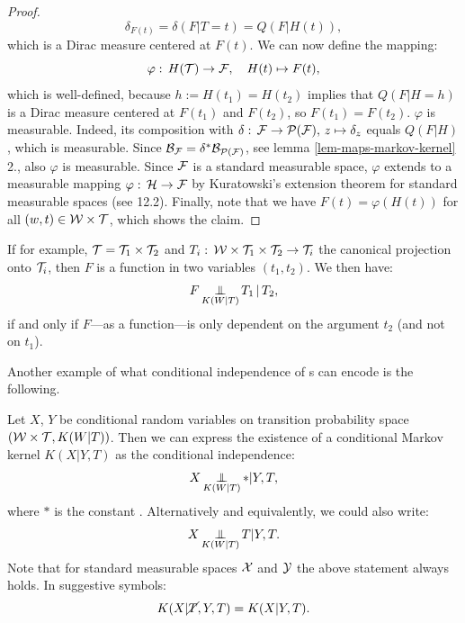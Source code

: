 \begin{Lem}
\begin{proof}
    \[ \delta_{F(t)} = \delta(F|T=t) = Q(F|H(t)),\]
    which is a Dirac measure centered at $F(t)$.
    We can now define the mapping:
    \[\varphi:\, H(\mathcal{T}) \to \mathcal{F}, \quad H(t) \mapsto F(t), \]
    which is well-defined, because $h:=H(t_1)=H(t_2)$ implies that $Q(F|H=h)$ is a Dirac measure centered at $F(t_1)$ and $F(t_2)$, so $F(t_1)=F(t_2)$.
    $\varphi$ is measurable.
    Indeed, its composition with $\delta:\,\mathcal{F} \to \mathcal{P}(\mathcal{F}), \, z \mapsto \delta_z$ equals $Q(F|H)$, which is measurable.
    Since $\mathcal{B}_{\mathcal{F}} = \delta^*\mathcal{B}_{\mathcal{P}(\mathcal{F})}$, see lemma \ref{lem-maps-markov-kernel} 2., also $\varphi$ is measurable.
    Since $\mathcal{F}$ is a standard measurable space, $\varphi$ extends to a measurable mapping $\varphi:\, \mathcal{H} \to \mathcal{F}$ by Kuratowski's extension theorem for standard measurable spaces (see \cite{Kec95} 12.2). 
    Finally, note that we have $F(t) = \varphi(H(t))$ for all $(w,t) \in \mathcal{W} \times \mathcal{T}$, which shows the claim.
\end{proof}
\end{Lem}


\begin{Eg}
    If for example, $\mathcal{T} = \mathcal{T}_1 \times \mathcal{T}_2$ and $T_i:\,\mathcal{W} \times \mathcal{T}_1 \times \mathcal{T}_2 \to \mathcal{T}_i$ the canonical projection onto $\mathcal{T}_i$,
    then $F$ is a function in two variables $(t_1,t_2)$.
    We then  have:
    \[ F \operatorname*{\perp\mkern-11mu\perp}_{K(W|T)} T_1 \operatorname*{|} T_2,\]
    if and only if $F$---as a function---is only dependent on the argument $t_2$ (and not on $t_1$).
\end{Eg}

Another example of what conditional independence of \trv{}s can encode is the following.

\begin{Rem}
    \label{conditional-markov-kernel-as-ci}
    Let $X$, $Y$ be conditional random variables on transition probability space $(\mathcal{W} \times \mathcal{T}, K(W|T))$.
    Then we can express the existence of a conditional Markov kernel $K(X|Y,T)$ as the conditional independence:
    \[ X\operatorname*{\perp\mkern-11mu\perp}_{K(W|T)} \ast|Y,T,  \]
    where $\ast$ is the constant \trv{}. Alternatively and equivalently, we could also write:
    \[ X\operatorname*{\perp\mkern-11mu\perp}_{K(W|T)} T|Y,T.  \]
    Note that for standard measurable spaces $\mathcal{X}$ and $\mathcal{Y}$ the above statement always holds.
    In suggestive symbols:
    \[ K(X|\cancel{T},Y,T) = K(X|Y,T). \]
\end{Rem}

